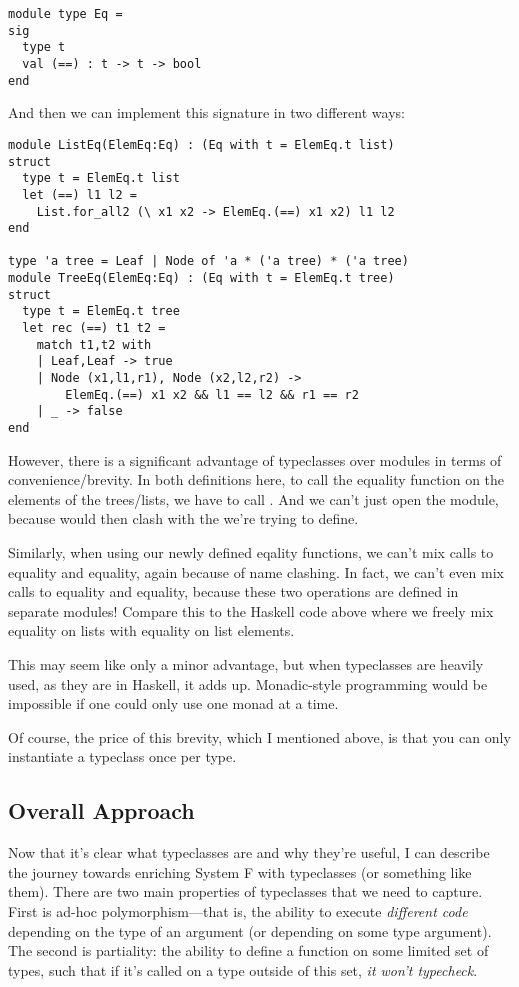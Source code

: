 \documentclass[pageno]{jpaper}
\begin{document}
{{{\begin{lstlisting}
module type Eq = 
sig
  type t
  val (==) : t -> t -> bool
end
\end{lstlisting}

And then we can implement this signature in two different ways:

\begin{lstlisting}
module ListEq(ElemEq:Eq) : (Eq with t = ElemEq.t list)
struct
  type t = ElemEq.t list
  let (==) l1 l2 =
    List.for_all2 (\ x1 x2 -> ElemEq.(==) x1 x2) l1 l2
end

type 'a tree = Leaf | Node of 'a * ('a tree) * ('a tree)
module TreeEq(ElemEq:Eq) : (Eq with t = ElemEq.t tree)
struct
  type t = ElemEq.t tree
  let rec (==) t1 t2 =
    match t1,t2 with
    | Leaf,Leaf -> true
    | Node (x1,l1,r1), Node (x2,l2,r2) ->
        ElemEq.(==) x1 x2 && l1 == l2 && r1 == r2
    | _ -> false
end

\end{lstlisting}

However, there is a significant advantage of typeclasses over modules in terms of convenience/brevity.
In both definitions here, to call the equality function on the elements of the trees/lists,
we have to call . And we can't just open the  module, because
 would then clash with the \lsti{==} we're trying to define.

Similarly, when using our newly defined eqality functions, we can't mix calls to  equality
and  equality, again because of name clashing. In fact, we can't even mix calls to
 equality and  equality, because these two operations are defined in
separate modules! Compare this to the Haskell code above where we freely mix equality on lists with
equality on list elements.

This may seem like only a minor advantage, but when typeclasses are heavily used, as they are in Haskell, it adds up. Monadic-style programming would be impossible if one could only use one monad at a time.

Of course, the price of this brevity, which I mentioned above, is that you can only instantiate a typeclass
once per type.

\subsection{Overall Approach}
Now that it's clear what typeclasses are and why they're useful, I can describe the journey towards enriching System F with typeclasses (or something like them). There are two main properties
of typeclasses that we need to capture. First is ad-hoc polymorphism---that is, the ability to execute \textit{different code} depending on the type of an argument (or depending on some type argument).
The second is partiality: the ability to define a function on some limited set of types, such that if it's called on a type outside of this set, \textit{it won't typecheck}.

}}}
\end{document}
